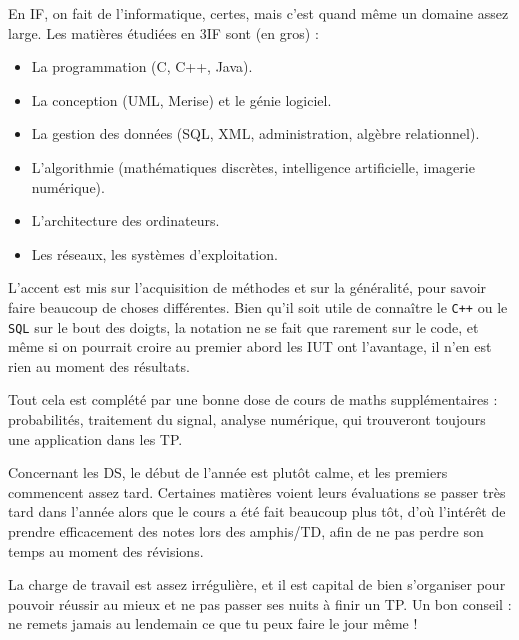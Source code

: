 En IF, on fait de l'informatique, certes, mais c'est quand même un domaine assez
large. Les matières étudiées en 3IF sont (en gros) :
\begin{itemize}
    \item La programmation (C, C++, Java).
    \item La conception (UML, Merise) et le génie logiciel.
    \item La gestion des données (SQL, XML, administration, algèbre relationnel).
    \item L'algorithmie (mathématiques discrètes, intelligence artificielle, imagerie numérique).
    \item L'architecture des ordinateurs.
    \item Les réseaux, les systèmes d'exploitation.
\end{itemize}

L'accent est mis sur l'acquisition de méthodes et sur la généralité, pour savoir faire beaucoup
de choses différentes. Bien qu'il soit utile de connaître le \texttt{C++} ou le \texttt{SQL} sur le bout
des doigts, la notation ne se fait que rarement sur le code, et même si on pourrait croire au premier abord les
IUT ont l'avantage, il n'en est rien au moment des résultats.

Tout cela est complété par une bonne dose de cours de maths supplémentaires : probabilités,
traitement du signal, analyse numérique, qui trouveront toujours une application dans les TP.

Concernant les DS, le début de l'année est plutôt calme, et les premiers
commencent assez tard. Certaines matières voient leurs évaluations se
passer très tard dans l'année alors que le cours a été fait beaucoup plus tôt,
d'où l'intérêt de prendre efficacement des notes lors des amphis/TD, afin de ne
pas perdre son temps au moment des révisions.

La charge de travail est assez irrégulière, et il est capital de bien s'organiser pour
pouvoir réussir au mieux et ne pas passer ses nuits à finir un TP. Un bon conseil : ne remets
jamais au lendemain ce que tu peux faire le jour même !

